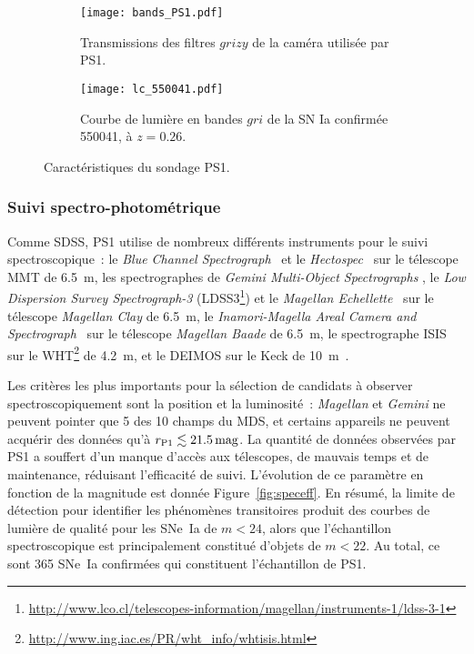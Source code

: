 \documentclass[../main/main.tex]{subfiles}
\begin{document}
\begin{figure}[h]
    \centering
    \begin{subfigure}[]{.49\linewidth}
        \centering
        \texttt{[image: bands\_PS1.pdf]}
        \captionsetup{justification=centering}
        \caption{Transmissions des filtres $grizy$ de la caméra utilisée par
        PS1.}
        \label{fig:ps1bands}
    \end{subfigure}
    \begin{subfigure}[]{.49\linewidth}
        \centering
        \texttt{[image: lc\_550041.pdf]}
        \captionsetup{justification=centering}
        \caption{Courbe de lumière en bandes $gri$ de la SN Ia confirmée 550041,
        à $z = 0.26$.}
        \label{fig:ps1bands}
    \end{subfigure}
    \caption{Caractéristiques du sondage PS1.}
\end{figure}

\subsubsection{Suivi spectro-photométrique}\label{sssec:ps1spectro}

Comme SDSS, PS1 utilise de nombreux différents instruments pour le suivi
spectroscopique~: le \textit{Blue Channel Spectrograph}~\citep{schmidt1989} et
le \textit{Hectospec}~\citep{fabricant2005} sur le télescope MMT de \SI{6.5}{m},
les spectrographes de \textit{Gemini Multi-Object Spectrographs}
\citep[GMOS,][]{hook2004}, le \textit{Low Dispersion Survey Spectrograph-3}
(LDSS3\footnote{\href{http://www.lco.cl/telescopes-information/magellan/instruments-1/ldss-3-1}
{http://www.lco.cl/telescopes-information/magellan/instruments-1/ldss-3-1}}) et
le \textit{Magellan Echellette}~\citep[MagE,][]{marshall2008} sur le télescope
\textit{Magellan Clay} de \SI{6.5}{m}, le \textit{Inamori-Magella Areal Camera
and Spectrograph}~\citep[IMACS,][]{dressler2011} sur le télescope
\textit{Magellan Baade} de \SI{6.5}{m}, le spectrographe ISIS sur le
WHT\footnote{\href{http://www.ing.iac.es/PR/wht_info/whtisis.html}
{http://www.ing.iac.es/PR/wht\_info/whtisis.html}} de \SI{4.2}{m}, et le DEIMOS
\citep{faber2003} sur le Keck de \SI{10}{m}~\citep{oke1995}.

Les critères les plus importants pour la sélection de candidats à observer
spectroscopiquement sont la position et la luminosité~: \textit{Magellan} et
\textit{Gemini} ne peuvent pointer que 5 des 10 champs du MDS, et certains
appareils ne peuvent acquérir des données qu'à $r_{\rm P1} \lesssim
\SI{21.5}{mag}$. La quantité de données observées par PS1 a souffert d'un manque
d'accès aux télescopes, de mauvais temps et de maintenance, réduisant
l'efficacité de suivi. L'évolution de ce paramètre en fonction de la magnitude
est donnée Figure~\ref{fig:speceff}. En résumé, la limite de détection pour
identifier les phénomènes transitoires produit des courbes de lumière de qualité
pour les SNe~Ia de $m < 24$, alors que l'échantillon spectroscopique est
principalement constitué d'objets de $m < 22$. Au total, ce sont 365 SNe~Ia
confirmées qui constituent l'échantillon de PS1.
\end{document}
